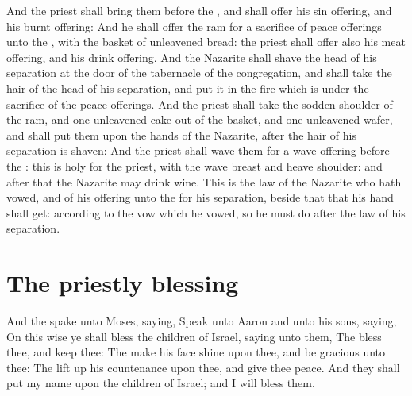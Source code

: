 \begin{biblechapter}
\verse And the priest shall bring them before the \LORD, and shall offer his sin offering, and his burnt offering:
\verse And he shall offer the ram for a sacrifice of peace offerings unto the \LORD, with the basket of unleavened bread: the priest shall offer also his meat offering, and his drink offering.
\verse And the Nazarite shall shave the head of his separation at the door of the tabernacle of the congregation, and shall take the hair of the head of his separation, and put it in the fire which is under the sacrifice of the peace offerings.
\verse And the priest shall take the sodden shoulder of the ram, and one unleavened cake out of the basket, and one unleavened wafer, and shall put them upon the hands of the Nazarite, after the hair of his separation is shaven:
\verse And the priest shall wave them for a wave offering before the \LORD: this is holy for the priest, with the wave breast and heave shoulder: and after that the Nazarite may drink wine.
\verse This is the law of the Nazarite who hath vowed, and of his offering unto the \LORD for his separation, beside that that his hand shall get: according to the vow which he vowed, so he must do after the law of his separation.
\section*{The priestly blessing}
\verse And the \LORD spake unto Moses, saying,
\verse Speak unto Aaron and unto his sons, saying, On this wise ye shall bless the children of Israel, saying unto them,
\verse The \LORD bless thee, and keep thee:
\verse The \LORD make his face shine upon thee, and be gracious unto thee:
\verse The \LORD lift up his countenance upon thee, and give thee peace.
\verse And they shall put my name upon the children of Israel; and I will bless them.
\end{biblechapter}

\columnbreak %

